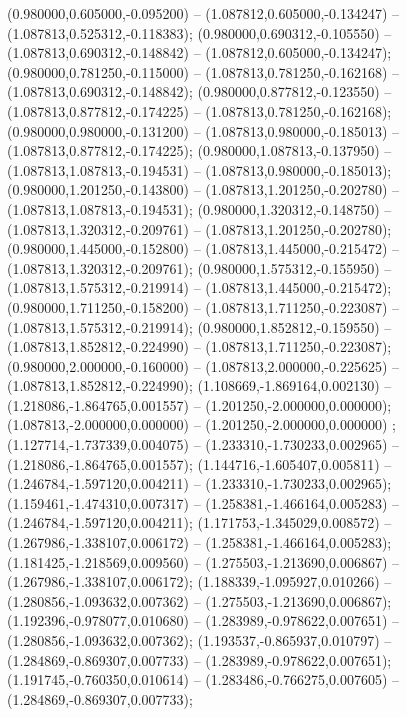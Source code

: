  (0.980000,0.605000,-0.095200) -- (1.087812,0.605000,-0.134247) -- (1.087813,0.525312,-0.118383);
 (0.980000,0.690312,-0.105550) -- (1.087813,0.690312,-0.148842) -- (1.087812,0.605000,-0.134247);
 (0.980000,0.781250,-0.115000) -- (1.087813,0.781250,-0.162168) -- (1.087813,0.690312,-0.148842);
 (0.980000,0.877812,-0.123550) -- (1.087813,0.877812,-0.174225) -- (1.087813,0.781250,-0.162168);
 (0.980000,0.980000,-0.131200) -- (1.087813,0.980000,-0.185013) -- (1.087813,0.877812,-0.174225);
 (0.980000,1.087813,-0.137950) -- (1.087813,1.087813,-0.194531) -- (1.087813,0.980000,-0.185013);
 (0.980000,1.201250,-0.143800) -- (1.087813,1.201250,-0.202780) -- (1.087813,1.087813,-0.194531);
 (0.980000,1.320312,-0.148750) -- (1.087813,1.320312,-0.209761) -- (1.087813,1.201250,-0.202780);
 (0.980000,1.445000,-0.152800) -- (1.087813,1.445000,-0.215472) -- (1.087813,1.320312,-0.209761);
 (0.980000,1.575312,-0.155950) -- (1.087813,1.575312,-0.219914) -- (1.087813,1.445000,-0.215472);
 (0.980000,1.711250,-0.158200) -- (1.087813,1.711250,-0.223087) -- (1.087813,1.575312,-0.219914);
 (0.980000,1.852812,-0.159550) -- (1.087813,1.852812,-0.224990) -- (1.087813,1.711250,-0.223087);
 (0.980000,2.000000,-0.160000) -- (1.087813,2.000000,-0.225625) -- (1.087813,1.852812,-0.224990);
 (1.108669,-1.869164,0.002130) -- (1.218086,-1.864765,0.001557) -- (1.201250,-2.000000,0.000000);
 (1.087813,-2.000000,0.000000) -- (1.201250,-2.000000,0.000000) ;
 (1.127714,-1.737339,0.004075) -- (1.233310,-1.730233,0.002965) -- (1.218086,-1.864765,0.001557);
 (1.144716,-1.605407,0.005811) -- (1.246784,-1.597120,0.004211) -- (1.233310,-1.730233,0.002965);
 (1.159461,-1.474310,0.007317) -- (1.258381,-1.466164,0.005283) -- (1.246784,-1.597120,0.004211);
 (1.171753,-1.345029,0.008572) -- (1.267986,-1.338107,0.006172) -- (1.258381,-1.466164,0.005283);
 (1.181425,-1.218569,0.009560) -- (1.275503,-1.213690,0.006867) -- (1.267986,-1.338107,0.006172);
 (1.188339,-1.095927,0.010266) -- (1.280856,-1.093632,0.007362) -- (1.275503,-1.213690,0.006867);
 (1.192396,-0.978077,0.010680) -- (1.283989,-0.978622,0.007651) -- (1.280856,-1.093632,0.007362);
 (1.193537,-0.865937,0.010797) -- (1.284869,-0.869307,0.007733) -- (1.283989,-0.978622,0.007651);
 (1.191745,-0.760350,0.010614) -- (1.283486,-0.766275,0.007605) -- (1.284869,-0.869307,0.007733);
